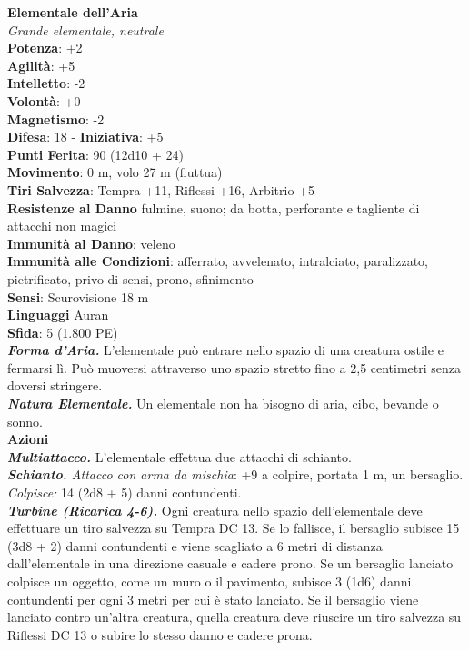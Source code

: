 \begin{multicols}{2}
\medskip\textbf{Elementale dell'Aria}\\
\emph{Grande elementale, neutrale}\\
\textbf{Potenza}: +2\\
\textbf{Agilità}: +5\\
\textbf{Intelletto}: -2\\
\textbf{Volontà}: +0\\
\textbf{Magnetismo}: -2\\
\textbf{Difesa}: 18 - \textbf{Iniziativa}: +5\\
\textbf{Punti Ferita}: 90 (12d10 + 24)\\
\textbf{Movimento}: 0 m, volo 27 m (fluttua)\\
\textbf{Tiri Salvezza}: Tempra +11, Riflessi +16, Arbitrio +5\\
\textbf{Resistenze al Danno} fulmine, suono; da botta, perforante e tagliente di attacchi non magici\\
\textbf{Immunità al Danno}: veleno\\
\textbf{Immunità alle Condizioni}: afferrato, avvelenato, intralciato, paralizzato, pietrificato, privo di sensi, prono, sfinimento\\
\textbf{Sensi}: Scurovisione 18 m\\
\textbf{Linguaggi} Auran\\
\textbf{Sfida}: 5 (1.800 PE)\smallskip\\
\emph{\textbf{Forma d'Aria.}} L'elementale può entrare nello spazio di una creatura ostile e fermarsi lì. Può muoversi attraverso uno spazio stretto fino a 2,5 centimetri senza doversi stringere.\\
\emph{\textbf{Natura Elementale.}} Un elementale non ha bisogno di aria, cibo, bevande o sonno.\\
\smallskip\textbf{Azioni}\\
\emph{\textbf{Multiattacco.}} L'elementale effettua due attacchi di schianto.\\
\emph{\textbf{Schianto.} Attacco con arma da mischia}: +9 a colpire, portata 1 m, un bersaglio.\\
\emph{Colpisce:} 14 (2d8 + 5) danni contundenti.\\
\emph{\textbf{Turbine (Ricarica 4-6).}} Ogni creatura nello spazio dell'elementale deve effettuare un tiro salvezza su Tempra DC 13. Se lo fallisce, il bersaglio subisce 15 (3d8 + 2) danni contundenti e viene scagliato a 6 metri di distanza dall'elementale in una direzione casuale e cadere prono. Se un bersaglio lanciato colpisce un oggetto, come un muro o il pavimento, subisce 3 (1d6) danni contundenti per ogni 3 metri per cui è stato lanciato. Se il bersaglio viene lanciato contro un'altra creatura, quella creatura deve riuscire un tiro salvezza su Riflessi DC 13 o subire lo stesso danno e cadere prona.\\

\end{multicols}
